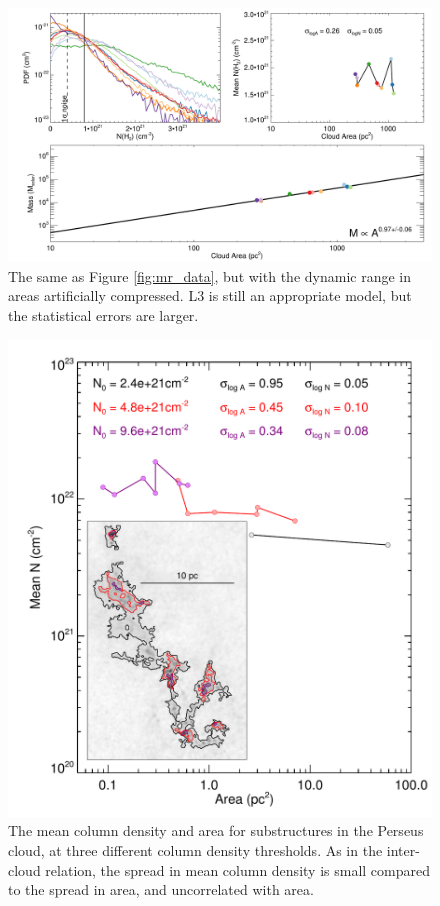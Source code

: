 \begin{figure}
\includegraphics[width=6in]{mr_data_shrink}
\caption{The same as Figure \ref{fig:mr_data}, but with the dynamic range in areas artificially compressed. L3 is still an appropriate model, but the statistical errors are larger.}
\label{fig:mr_shrink}
\end{figure}

\begin{figure}
\includegraphics[width=6in]{perseus}
\caption{The mean column density and area for substructures in the Perseus cloud, at three different column density thresholds. As in the inter-cloud relation, the spread in mean column density is small compared to the spread in area, and uncorrelated with area.}
\label{fig:perseus}
\end{figure}
